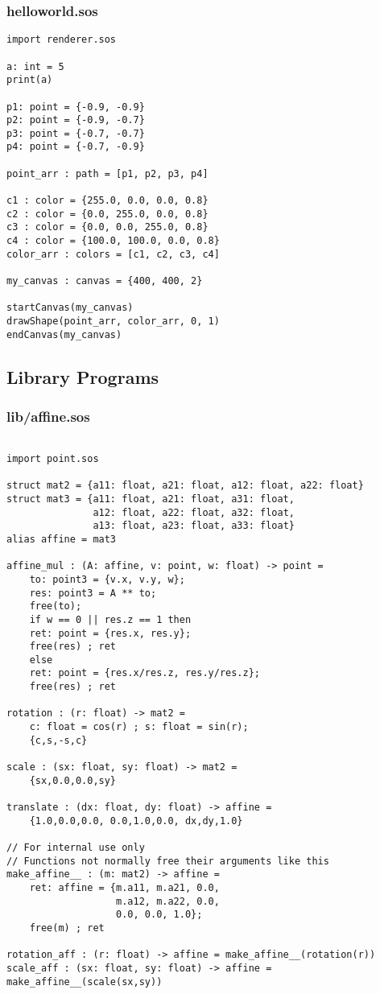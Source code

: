 \documentclass[main.tex]{subfiles}
\begin{document}
\subsubsection{helloworld.sos}
\begin{lstlisting}
import renderer.sos

a: int = 5
print(a)

p1: point = {-0.9, -0.9}
p2: point = {-0.9, -0.7}
p3: point = {-0.7, -0.7}
p4: point = {-0.7, -0.9}

point_arr : path = [p1, p2, p3, p4]

c1 : color = {255.0, 0.0, 0.0, 0.8}
c2 : color = {0.0, 255.0, 0.0, 0.8}
c3 : color = {0.0, 0.0, 255.0, 0.8}
c4 : color = {100.0, 100.0, 0.0, 0.8}
color_arr : colors = [c1, c2, c3, c4]

my_canvas : canvas = {400, 400, 2}

startCanvas(my_canvas)
drawShape(point_arr, color_arr, 0, 1)
endCanvas(my_canvas)
\end{lstlisting}

\subsection{Library Programs}

\subsubsection{lib/affine.sos}

\begin{lstlisting}

import point.sos

struct mat2 = {a11: float, a21: float, a12: float, a22: float}
struct mat3 = {a11: float, a21: float, a31: float,
               a12: float, a22: float, a32: float,
               a13: float, a23: float, a33: float}
alias affine = mat3

affine_mul : (A: affine, v: point, w: float) -> point =
    to: point3 = {v.x, v.y, w};
    res: point3 = A ** to;
    free(to);
    if w == 0 || res.z == 1 then
    ret: point = {res.x, res.y};
    free(res) ; ret
    else
    ret: point = {res.x/res.z, res.y/res.z};
    free(res) ; ret

rotation : (r: float) -> mat2 = 
    c: float = cos(r) ; s: float = sin(r);
    {c,s,-s,c}

scale : (sx: float, sy: float) -> mat2 = 
    {sx,0.0,0.0,sy}

translate : (dx: float, dy: float) -> affine =
    {1.0,0.0,0.0, 0.0,1.0,0.0, dx,dy,1.0}

// For internal use only
// Functions not normally free their arguments like this
make_affine__ : (m: mat2) -> affine = 
    ret: affine = {m.a11, m.a21, 0.0,
                   m.a12, m.a22, 0.0,
                   0.0, 0.0, 1.0};
    free(m) ; ret

rotation_aff : (r: float) -> affine = make_affine__(rotation(r))
scale_aff : (sx: float, sy: float) -> affine = make_affine__(scale(sx,sy))
\end{lstlisting}
\end{document}
